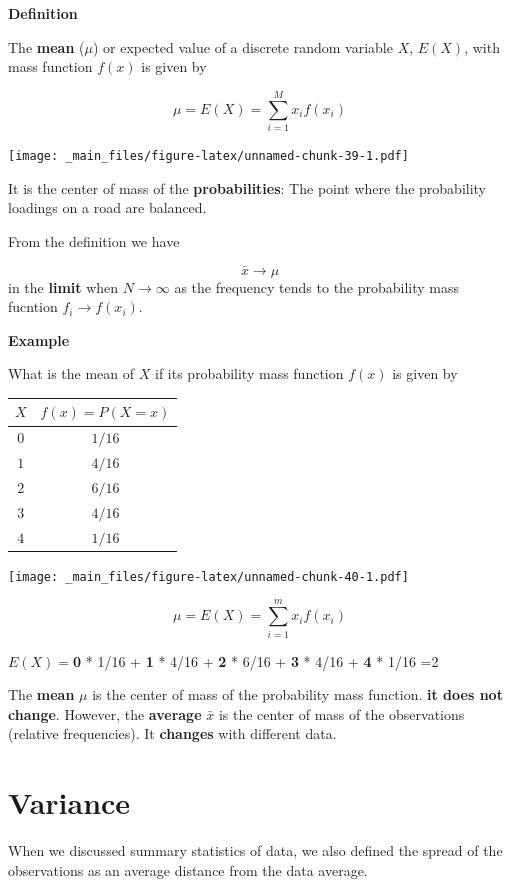 \documentclass[
]{book}
\begin{document}
\textbf{Definition}

The \textbf{mean} (\(\mu\)) or expected value of a discrete random variable \(X\), \(E(X)\), with mass function \(f(x)\) is given by

\[ \mu = E(X)= \sum_{i=1}^M x_i f(x_i) \]

\texttt{[image: \_main\_files/figure-latex/unnamed-chunk-39-1.pdf]}

It is the center of mass of the \textbf{probabilities}: The point where the probability loadings on a road are balanced.

From the definition we have

\[\bar{x} \rightarrow \mu\] in the \textbf{limit} when
\(N \rightarrow \infty\) as the frequency tends to the probability mass fucntion \(f_i \rightarrow f(x_i)\).

\textbf{Example}

What is the mean of \(X\) if its probability mass function \(f(x)\) is given by

\begin{longtable}[]{@{}cc@{}}
\toprule\noalign{}
\(X\) & \(f(x)=P(X=x)\) \\
\midrule\noalign{}
\endhead
\bottomrule\noalign{}
\endlastfoot
\(0\) & \(1/16\) \\
\(1\) & \(4/16\) \\
\(2\) & \(6/16\) \\
\(3\) & \(4/16\) \\
\(4\) & \(1/16\) \\
\end{longtable}

\texttt{[image: \_main\_files/figure-latex/unnamed-chunk-40-1.pdf]}

\[ \mu =E(X)=\sum_{i=1}^m x_i f(x_i) \]

\(E(X)=\)\textbf{0} * 1/16 + \textbf{1} * 4/16 + \textbf{2} * 6/16 + \textbf{3} * 4/16 + \textbf{4} * 1/16 =2

The \textbf{mean} \(\mu\) is the center of mass of the probability mass function. \textbf{it does not change}. However, the \textbf{average} \(\bar{x}\) is the center of mass of the observations (relative frequencies). It \textbf{changes} with different data.

\hypertarget{variance}{%
\section{Variance}\label{variance}}

When we discussed summary statistics of data, we also defined the spread of the observations as an average distance from the data average.
\end{document}
